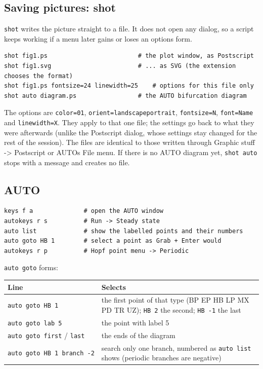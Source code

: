 \documentclass{article}
\begin{document}
\subsection{Saving pictures: shot}\label{scr:5}

\texttt{shot} writes the picture straight to a file. It does not
open any dialog, so a script keeps working if a menu later gains or
loses an options form.

{\small\begin{verbatim}
shot fig1.ps                         # the plot window, as Postscript
shot fig1.svg                        # ... as SVG (the extension chooses the format)
shot fig1.ps fontsize=24 linewidth=25    # options for this file only
shot auto diagram.ps                 # the AUTO bifurcation diagram
\end{verbatim}}

The options are \texttt{color=0\textbar{}1},
\texttt{orient=landscape\textbar{}portrait}, \texttt{fontsize=N},
\texttt{font=Name} and \texttt{linewidth=X}. They apply to that
one file; the settings go back to what they were afterwards (unlike the
Postscript dialog, whose settings stay changed for the rest of the
session). The files are identical to those written through Graphic stuff
-\textgreater{} Postscript or AUTO\textquotesingle s File menu. If there is no AUTO diagram yet,
\texttt{shot\ auto} stops with a message and creates no file.

\subsection{AUTO}\label{scr:6}

{\small\begin{verbatim}
keys f a              # open the AUTO window
autokeys r s          # Run -> Steady state
auto list             # show the labelled points and their numbers
auto goto HB 1        # select a point as Grab + Enter would
autokeys r p          # Hopf point menu -> Periodic
\end{verbatim}}

\texttt{auto\ goto} forms:

\begin{longtable}[]{@{}p{}p{}@{}}
\toprule\noalign{}
Line & Selects \\
\midrule\noalign{}
\endhead
\bottomrule\noalign{}
\endlastfoot
\texttt{auto\ goto\ HB\ 1} & the first point of that type (BP EP HB LP MX PD TR UZ);
\texttt{HB\ 2} the second; \texttt{HB\ -1} the last \\
\texttt{auto\ goto\ lab\ 5} & the point with label 5 \\
\texttt{auto\ goto\ first} / \texttt{last} & the ends of the diagram \\
\texttt{auto\ goto\ HB\ 1\ branch\ -2} & search only one branch, numbered as \texttt{auto\ list} shows
(periodic branches are negative) \\
\end{longtable}
\end{document}
